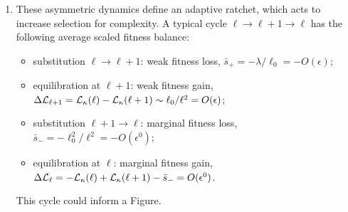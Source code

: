 \documentclass[10pt,a4paper]{article}
\newcommand{\ep}{\epsilon}
\renewcommand{\L}{{\cal L}}
\newcommand{\EQA}{\begin{eqnarray}}
\newcommand{\EEA}{\end{eqnarray}}
\begin{document}
{\begin{enumerate}
In this framework, we find the processes $\ell \to \ell +1$ with average selection coefficient
\EQA
\bar s_+ & = & \frac{3}{4} \frac{(-s)}{4} + \frac{1}{4} \frac{3s}{4} - \frac{\lambda}{\ell_0}
\\
& = & - \frac{\lambda}{\ell_0}
\EEA
(near-neutral evolution) and the processes $\ell \to \ell - 1$ with average scaled selection coefficent
\EQA
\bar s_- & = & \gamma \frac{(-3s)}{4} + (1 - \gamma) \frac{s}{4} + \frac{\lambda}{\ell_0}
\\
& = & -(\gamma - \gamma_0) s + \frac{\lambda}{\ell_0}
\\
& = & - (\gamma - \gamma_0)^2 (1 + \kappa) + \frac{\lambda}{\ell_0}
\\
& = & \ell_0 \frac{\partial \L_\kappa}{\partial \ell} + \frac{\partial \L_\lambda}{\partial \ell}
\EEA
(marginal selection). These selection coefficients are of different magnitude: length increases are constrained only by the weak linear term, length decreases are marginally constrained by conservation of site function.

\item These asymmetric dynamics define an adaptive ratchet, which acts to increase selection for complexity. A typical cycle $\ell \to \ell + 1 \to \ell$ has the following average scaled fitness balance:
\begin{itemize}
\item substitution $\ell \to \ell + 1$: weak fitness loss, $\bar s_+ = - \lambda / \ell_0 = - O(\ep)$;
\item equilibration at $\ell + 1$: weak fitness gain, $\Delta \L_{\ell + 1} = \L_\kappa (\ell) - \L_\kappa (\ell +1) \sim \ell_0 /\ell^2 = O( \ep)$;
\item substitution $\ell + 1 \to \ell$: marginal fitness loss,   $\bar s_- = - \ell_0^2 /\ell^2 =- O(\ep^0) $;
\item equilibration at $\ell$: marginal fitness gain, $\Delta \L_{\ell} = - \L_\kappa (\ell) + \L_\kappa (\ell +1) - \bar s_- = O(\ep^0)  $.
\end{itemize}
This cycle could inform a Figure.


\end{enumerate}}
\end{document}
